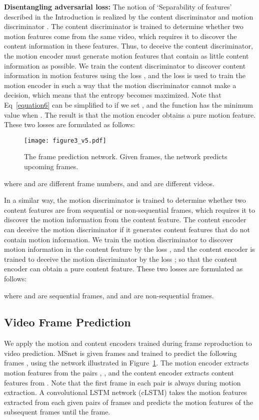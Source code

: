 \textbf{Disentangling adversarial loss: }
The notion of `Separability of features' described in the Introduction is realized by the content discriminator  and motion discriminator .
The content discriminator is trained to determine whether two motion features come from the same video, which requires it to discover the content information in these features.
Thus, to deceive the content discriminator, the motion encoder must generate motion features that contain as little content information as possible.
We train the content discriminator to discover content information in motion features using the loss , and the loss  is used to train the motion encoder in such a way that the motion discriminator cannot make a decision, which means that the entropy becomes maximized. Note that Eq~\ref{equation6} can be simplified to  if we set , and the function has the minimum value when . 
The result is that the motion encoder obtains a pure motion feature. These two losses are formulated as follows:
\begin{figure}[t]
    \centering
    \texttt{[image: figure3\_v5.pdf]}
    \caption{The frame prediction network. Given  frames, the network predicts upcoming  frames.} 
\vspace*{-10pt}
\label{fig_2}
\end{figure}
\small{

}
where  and  are different frame numbers, and  and  are different videos.




In a similar way, the motion discriminator is trained to determine whether two content features are from sequential or non-sequential frames, which requires it to discover the motion information from the content feature.
The content encoder can deceive the motion discriminator if it generates content features that do not contain motion information. 
We train the motion discriminator to discover motion information in the content feature by the loss , and the content encoder is trained to deceive the motion discriminator by the loss ; so that the content encoder can obtain a pure content feature. These two losses are formulated as follows:


where  and  are sequential frames, and  and  are non-sequential frames.

\subsection{Video Frame Prediction}
\label{futureframepred}
We apply the motion and content encoders trained during frame reproduction to video prediction. MSnet is given  frames  and trained to predict the following  frames , using the network illustrated in Figure~\ref{fig_2}. The motion encoder extracts motion features from the pairs , , and the content encoder extracts content features from . Note that the first frame in each pair is always  during motion extraction. A convolutional LSTM network (cLSTM) \cite{xingjian2015convolutional} takes the motion features  extracted from each given pairs of frames and predicts the motion features of the subsequent frames  until the  frame. 

